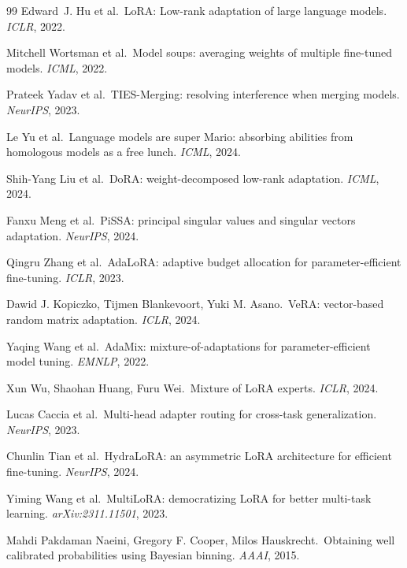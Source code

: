 \documentclass[11pt]{article}
\begin{document}
\begin{thebibliography}{99}
Edward~J. Hu et al.\ LoRA: Low-rank adaptation of large language models. \emph{ICLR}, 2022.

Mitchell Wortsman et al.\ Model soups: averaging weights of multiple fine-tuned models. \emph{ICML}, 2022.

Prateek Yadav et al.\ TIES-Merging: resolving interference when merging models. \emph{NeurIPS}, 2023.

Le Yu et al.\ Language models are super Mario: absorbing abilities from homologous models as a free lunch. \emph{ICML}, 2024.

Shih-Yang Liu et al.\ DoRA: weight-decomposed low-rank adaptation. \emph{ICML}, 2024.

Fanxu Meng et al.\ PiSSA: principal singular values and singular vectors adaptation. \emph{NeurIPS}, 2024.

Qingru Zhang et al.\ AdaLoRA: adaptive budget allocation for parameter-efficient fine-tuning. \emph{ICLR}, 2023.

Dawid J. Kopiczko, Tijmen Blankevoort, Yuki M. Asano.\ VeRA: vector-based random matrix adaptation. \emph{ICLR}, 2024.

Yaqing Wang et al.\ AdaMix: mixture-of-adaptations for parameter-efficient model tuning. \emph{EMNLP}, 2022.

Xun Wu, Shaohan Huang, Furu Wei.\ Mixture of LoRA experts. \emph{ICLR}, 2024.

Lucas Caccia et al.\ Multi-head adapter routing for cross-task generalization. \emph{NeurIPS}, 2023.

Chunlin Tian et al.\ HydraLoRA: an asymmetric LoRA architecture for efficient fine-tuning. \emph{NeurIPS}, 2024.

Yiming Wang et al.\ MultiLoRA: democratizing LoRA for better multi-task learning. \emph{arXiv:2311.11501}, 2023.

Mahdi Pakdaman Naeini, Gregory F. Cooper, Milos Hauskrecht.\ Obtaining well calibrated probabilities using Bayesian binning. \emph{AAAI}, 2015.


\end{thebibliography}
\end{document}
